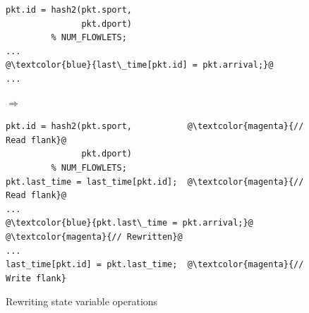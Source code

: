 \begin{figure}[!t]
  \begin{minipage}{0.43\textwidth}
  \begin{small}
  \begin{lstlisting}[style=customc, numbers=none, frame=none]
pkt.id = hash2(pkt.sport,
               pkt.dport)
         % NUM_FLOWLETS;
...
@\textcolor{blue}{last\_time[pkt.id] = pkt.arrival;}@
...
  \end{lstlisting}
  \end{small}
  \end{minipage}
%  
  \hspace{-0.5in}
  $\Longrightarrow$ 
  \hspace{-0.2in}
%  
  \begin{minipage}{0.61\textwidth}
  \begin{small}
  \begin{lstlisting}[style=customc, numbers=none, frame=none]
pkt.id = hash2(pkt.sport,           @\textcolor{magenta}{// Read flank}@
               pkt.dport)
         % NUM_FLOWLETS;
pkt.last_time = last_time[pkt.id];  @\textcolor{magenta}{// Read flank}@
...
@\textcolor{blue}{pkt.last\_time = pkt.arrival;}@             @\textcolor{magenta}{// Rewritten}@
...
last_time[pkt.id] = pkt.last_time;  @\textcolor{magenta}{// Write flank}
  \end{lstlisting}
  \end{small}
  \end{minipage}
  \caption{Rewriting state variable operations}
\label{fig:stateful_flanks}
\end{figure}

